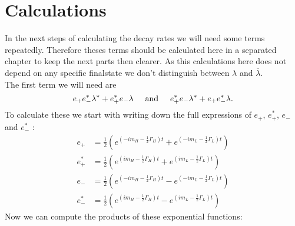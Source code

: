\section{Calculations}

In the next steps of calculating the decay rates we will need some terms repeatedly. Therefore theses terms should be calculated here in a separated chapter
to keep the next parts then clearer. As this calculations here does not depend on any specific finalstate we don't distinguish between $\lambda$ and
$\overline{\lambda}$.\\
The first term we will need are
\begin{equation}
    e_{+}e_{-}^*\lambda^{\ast}+e_+^*e_-\lambda \hspace{0.5cm} \text{and} \hspace{0.5cm} e_{+}^*e_{-}\lambda^{\ast}+e_+e_-^*\lambda.
\end{equation}
To calculate these we start with writing down the full expressions of $e_+$, $e_+^*$, $e_-$ and $e_-^*$ :
\begin{align}
  e_+ &= \frac{1}{2}\left(e^{\left(-im_H-\frac{1}{2}\Gamma_H\right)t}+e^{\left(-im_L-\frac{1}{2}\Gamma_L\right)t}\right)\\
  e_+^* &= \frac{1}{2}\left(e^{\left(im_H-\frac{1}{2}\Gamma_H\right)t}+e^{\left(im_L-\frac{1}{2}\Gamma_L\right)t}\right)\\
  e_- &= \frac{1}{2}\left(e^{\left(-im_H-\frac{1}{2}\Gamma_H\right)t}-e^{\left(-im_L-\frac{1}{2}\Gamma_L\right)t}\right)\\
  e_-^* &= \frac{1}{2}\left(e^{\left(im_H-\frac{1}{2}\Gamma_H\right)t}-e^{\left(im_L-\frac{1}{2}\Gamma_L\right)t}\right)
\end{align}
Now we can compute the products of these exponential functions:

